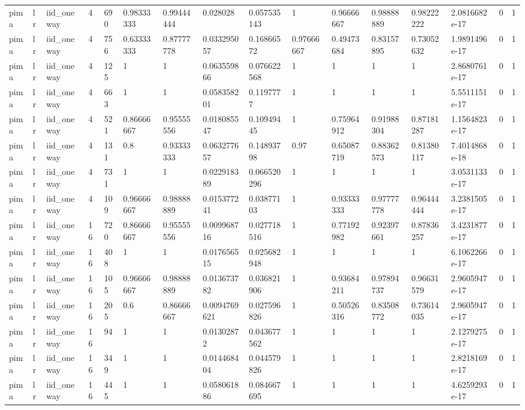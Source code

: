 \begin{tabular}{llllllllllllllll}
pima & lr & iid\_oneway & 4 & 690 & 0.98333333 & 0.99444444 & 0.028028 & 0.057535143 & 1 & 0.96666667 & 0.98888889 & 0.98222222 & 2.0816682e-17 & 0 & 1 \\
pima & lr & iid\_oneway & 4 & 756 & 0.63333333 & 0.87777778 & 0.033295057 & 0.16866572 & 0.97666667 & 0.49473684 & 0.83157895 & 0.73052632 & 1.9891496e-17 & 0 & 1 \\
pima & lr & iid\_oneway & 4 & 125 & 1 & 1 & 0.063559866 & 0.076622568 & 1 & 1 & 1 & 1 & 2.8680761e-17 & 0 & 1 \\
pima & lr & iid\_oneway & 4 & 663 & 1 & 1 & 0.058358201 & 0.1197777 & 1 & 1 & 1 & 1 & 5.5511151e-17 & 0 & 1 \\
pima & lr & iid\_oneway & 4 & 521 & 0.86666667 & 0.95555556 & 0.018085547 & 0.10949445 & 1 & 0.75964912 & 0.91988304 & 0.87181287 & 1.1564823e-17 & 0 & 1 \\
pima & lr & iid\_oneway & 4 & 131 & 0.8 & 0.93333333 & 0.063277657 & 0.14893798 & 0.97 & 0.65087719 & 0.88362573 & 0.81380117 & 7.4014868e-18 & 0 & 1 \\
pima & lr & iid\_oneway & 4 & 731 & 1 & 1 & 0.022918389 & 0.066520296 & 1 & 1 & 1 & 1 & 3.0531133e-17 & 0 & 1 \\
pima & lr & iid\_oneway & 4 & 109 & 0.96666667 & 0.98888889 & 0.015377241 & 0.03877103 & 1 & 0.93333333 & 0.97777778 & 0.96444444 & 3.2381505e-17 & 0 & 1 \\
pima & lr & iid\_oneway & 16 & 720 & 0.86666667 & 0.95555556 & 0.009968716 & 0.027718516 & 1 & 0.77192982 & 0.92397661 & 0.87836257 & 3.4231877e-17 & 0 & 1 \\
pima & lr & iid\_oneway & 16 & 408 & 1 & 1 & 0.017656515 & 0.025682948 & 1 & 1 & 1 & 1 & 6.1062266e-17 & 0 & 1 \\
pima & lr & iid\_oneway & 16 & 105 & 0.96666667 & 0.98888889 & 0.013673782 & 0.036821906 & 1 & 0.93684211 & 0.97894737 & 0.96631579 & 2.9605947e-17 & 0 & 1 \\
pima & lr & iid\_oneway & 16 & 205 & 0.6 & 0.86666667 & 0.0094769621 & 0.027596826 & 1 & 0.50526316 & 0.83508772 & 0.73614035 & 2.9605947e-17 & 0 & 1 \\
pima & lr & iid\_oneway & 16 & 94 & 1 & 1 & 0.01302872 & 0.043677562 & 1 & 1 & 1 & 1 & 2.1279275e-17 & 0 & 1 \\
pima & lr & iid\_oneway & 16 & 349 & 1 & 1 & 0.014468404 & 0.044579826 & 1 & 1 & 1 & 1 & 2.8218169e-17 & 0 & 1 \\
pima & lr & iid\_oneway & 16 & 445 & 1 & 1 & 0.058061886 & 0.084667695 & 1 & 1 & 1 & 1 & 4.6259293e-17 & 0 & 1 \\

\end{tabular}
